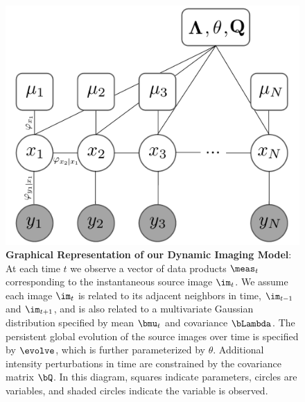 

\begin{figure}
	\centering
	\includegraphics[width=0.8\linewidth]{figures/graphicalmodel_2.pdf}
\caption{{\bf Graphical Representation of our Dynamic Imaging Model}: At each time $t$ we observe a vector of data products $\meas_t$ corresponding to the instantaneous source image $\im_t$. 
	We assume each image $\im_t$ is related to its adjacent neighbors in time, $\im_{t-1}$ and $\im_{t+1}$, and is also related to a multivariate Gaussian distribution specified by mean $\bmu_t$ and covariance $\bLambda$. The persistent global evolution of the source images over time is specified by $\evolve$, which is further parameterized by $\theta$. Additional intensity perturbations in time are constrained by the covariance matrix $\bQ$. In this diagram, squares indicate parameters, circles are variables, and shaded circles indicate the variable is observed. }
\label{fig:model}
\vspace{-.2in}
\end{figure}









